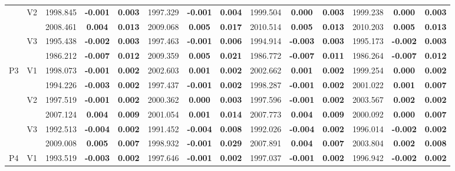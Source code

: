 \documentclass[12pt,a4paper]{article}
\begin{document}
\begin{sidewaystable}[H]
{\begin{tabular}{cc|ccc|ccc|ccc|ccc|}
   & \multirow{2}{*}{V2} & 1998.845 & \textbf{-0.001} & \textbf{0.003} & 1997.329 & \textbf{-0.001} & \textbf{0.004} & 1999.504 & \textbf{0.000} & \textbf{0.003} & 1999.238 & \textbf{0.000} & \textbf{0.003} \\ 
   &  & 2008.461 & \textbf{0.004} & \textbf{0.013} & 2009.068 & \textbf{0.005} & \textbf{0.017} & 2010.514 & \textbf{0.005} & \textbf{0.013} & 2010.203 & \textbf{0.005} & \textbf{0.013} \\ 
   & \multirow{2}{*}{V3} & 1995.438 & \textbf{-0.002} & \textbf{0.003} & 1997.463 & \textbf{-0.001} & \textbf{0.006} & 1994.914 & \textbf{-0.003} & \textbf{0.003} & 1995.173 & \textbf{-0.002} & \textbf{0.003} \\ 
   &  & 1986.212 & \textbf{-0.007} & \textbf{0.012} & 2009.359 & \textbf{0.005} & \textbf{0.021} & 1986.772 & \textbf{-0.007} & \textbf{0.011} & 1986.264 & \textbf{-0.007} & \textbf{0.012} \\ 
   \hline \hline\multirow{6}{*}{P3} & \multirow{2}{*}{V1} & 1998.073 & \textbf{-0.001} & \textbf{0.002} & 2002.603 & \textbf{0.001} & \textbf{0.002} & 2002.662 & \textbf{0.001} & \textbf{0.002} & 1999.254 & \textbf{0.000} & \textbf{0.002} \\ 
   &  & 1994.226 & \textbf{-0.003} & \textbf{0.002} & 1997.437 & \textbf{-0.001} & \textbf{0.002} & 1998.287 & \textbf{-0.001} & \textbf{0.002} & 2001.022 & \textbf{0.001} & \textbf{0.007} \\ 
   & \multirow{2}{*}{V2} & 1997.519 & \textbf{-0.001} & \textbf{0.002} & 2000.362 & \textbf{0.000} & \textbf{0.003} & 1997.596 & \textbf{-0.001} & \textbf{0.002} & 2003.567 & \textbf{0.002} & \textbf{0.002} \\ 
   &  & 2007.124 & \textbf{0.004} & \textbf{0.009} & 2001.054 & \textbf{0.001} & \textbf{0.014} & 2007.773 & \textbf{0.004} & \textbf{0.009} & 2000.092 & \textbf{0.000} & \textbf{0.007} \\ 
   & \multirow{2}{*}{V3} & 1992.513 & \textbf{-0.004} & \textbf{0.002} & 1991.452 & \textbf{-0.004} & \textbf{0.008} & 1992.026 & \textbf{-0.004} & \textbf{0.002} & 1996.014 & \textbf{-0.002} & \textbf{0.002} \\ 
   &  & 2009.008 & \textbf{0.005} & \textbf{0.007} & 1998.932 & \textbf{-0.001} & \textbf{0.029} & 2007.891 & \textbf{0.004} & \textbf{0.007} & 2003.804 & \textbf{0.002} & \textbf{0.008} \\ 
   \hline \hline\multirow{6}{*}{P4} & \multirow{2}{*}{V1} & 1993.519 & \textbf{-0.003} & \textbf{0.002} & 1997.646 & \textbf{-0.001} & \textbf{0.002} & 1997.037 & \textbf{-0.001} & \textbf{0.002} & 1996.942 & \textbf{-0.002} & \textbf{0.002} \\ 

\end{tabular}}
\end{sidewaystable}
\end{document}
